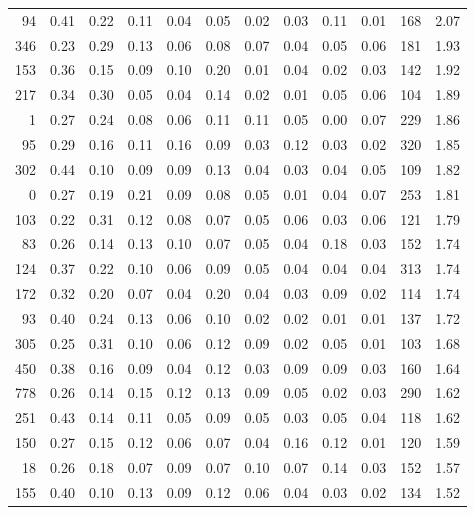 \begin{tabular}{rrrrrrrrrrll}
           94 & 0.41 & 0.22 & 0.11 & 0.04 & 0.05 & 0.02 & 0.03 & 0.11 & 0.01 & 168 &  2.07 \\
          346 & 0.23 & 0.29 & 0.13 & 0.06 & 0.08 & 0.07 & 0.04 & 0.05 & 0.06 & 181 &  1.93 \\
          153 & 0.36 & 0.15 & 0.09 & 0.10 & 0.20 & 0.01 & 0.04 & 0.02 & 0.03 & 142 &  1.92 \\
          217 & 0.34 & 0.30 & 0.05 & 0.04 & 0.14 & 0.02 & 0.01 & 0.05 & 0.06 & 104 &  1.89 \\
            1 & 0.27 & 0.24 & 0.08 & 0.06 & 0.11 & 0.11 & 0.05 & 0.00 & 0.07 & 229 &  1.86 \\
           95 & 0.29 & 0.16 & 0.11 & 0.16 & 0.09 & 0.03 & 0.12 & 0.03 & 0.02 & 320 &  1.85 \\
          302 & 0.44 & 0.10 & 0.09 & 0.09 & 0.13 & 0.04 & 0.03 & 0.04 & 0.05 & 109 &  1.82 \\
            0 & 0.27 & 0.19 & 0.21 & 0.09 & 0.08 & 0.05 & 0.01 & 0.04 & 0.07 & 253 &  1.81 \\
          103 & 0.22 & 0.31 & 0.12 & 0.08 & 0.07 & 0.05 & 0.06 & 0.03 & 0.06 & 121 &  1.79 \\
           83 & 0.26 & 0.14 & 0.13 & 0.10 & 0.07 & 0.05 & 0.04 & 0.18 & 0.03 & 152 &  1.74 \\
          124 & 0.37 & 0.22 & 0.10 & 0.06 & 0.09 & 0.05 & 0.04 & 0.04 & 0.04 & 313 &  1.74 \\
          172 & 0.32 & 0.20 & 0.07 & 0.04 & 0.20 & 0.04 & 0.03 & 0.09 & 0.02 & 114 &  1.74 \\
           93 & 0.40 & 0.24 & 0.13 & 0.06 & 0.10 & 0.02 & 0.02 & 0.01 & 0.01 & 137 &  1.72 \\
          305 & 0.25 & 0.31 & 0.10 & 0.06 & 0.12 & 0.09 & 0.02 & 0.05 & 0.01 & 103 &  1.68 \\
          450 & 0.38 & 0.16 & 0.09 & 0.04 & 0.12 & 0.03 & 0.09 & 0.09 & 0.03 & 160 &  1.64 \\
          778 & 0.26 & 0.14 & 0.15 & 0.12 & 0.13 & 0.09 & 0.05 & 0.02 & 0.03 & 290 &  1.62 \\
          251 & 0.43 & 0.14 & 0.11 & 0.05 & 0.09 & 0.05 & 0.03 & 0.05 & 0.04 & 118 &  1.62 \\
          150 & 0.27 & 0.15 & 0.12 & 0.06 & 0.07 & 0.04 & 0.16 & 0.12 & 0.01 & 120 &  1.59 \\
           18 & 0.26 & 0.18 & 0.07 & 0.09 & 0.07 & 0.10 & 0.07 & 0.14 & 0.03 & 152 &  1.57 \\
          155 & 0.40 & 0.10 & 0.13 & 0.09 & 0.12 & 0.06 & 0.04 & 0.03 & 0.02 & 134 &  1.52 \\

\end{tabular}
